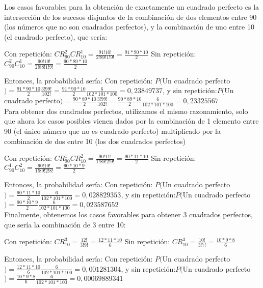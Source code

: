 \documentclass[a4paper,12pt]{article}
\begin{document}
\begin{enumerate}
\begin{enumerate}[label=\alph*)]
    Los casos favorables para la obtención de exactamente un cuadrado perfecto es la intersección de los sucesos disjuntos de la combinación de dos elementos entre 90 (los números que no son cuadrados perfectos), y la combinación de uno entre 10 (el cuadrado perfecto), que sería: 

    Con repetición: $CR_{90}^2CR_{10}^1=\frac{91!10!}{2!89!1!9!}=\frac{91*90*10}{2}$
    Sin repetición: $C_{90}^2C_{10}^1=\frac{90!10!}{2!88!1!9!}=\frac{90*89*10}{2}$

    Entonces, la probabilidad sería: Con repetición: $P($Un cuadrado perfecto$)=\frac{91*90*10}{2}\frac{3!99!}{102!}=\frac{91*90*10}{2}\frac{6}{102*101*100}=0,23849737$, y sin repetición:$P($Un cuadrado perfecto$)=\frac{90*89*10}{2}\frac{3!99!}{102!}=\frac{90*89*10}{2}\frac{6}{102*101*100}=0,23325567$\\

    Para obtener dos cuadrados perfectos, utilizamos el mismo razonamiento, solo que ahora los casos posibles vienen dados por la combinación de 1 elemento entre 90 (el único número que no es cuadrado perfecto) multiplicado por la combinación de dos entre 10 (los dos cuadrados perfectos)

    Con repetición: $CR_{90}^1CR_{10}^2=\frac{90!11!}{1!89!2!9!}=\frac{90*11*10}{2}$
    Sin repetición: $C_{90}^1C_{10}^2=\frac{90!10!}{1!89!2!8!}=\frac{90*10*9}{2}$

    Entonces, la probabilidad sería: Con repetición: $P($Un cuadrado perfecto$)=\frac{90*11*10}{2}\frac{6}{102*101*100}=0,028829353$, y sin repetición:$P($Un cuadrado perfecto$)=\frac{90*10*9}{2}\frac{6}{102*101*100}=0,023587652$\\

    Finalmente, obtenemos los casos favorables para obtener 3 cuadrados perfectos, que sería la combinación de 3 entre 10:

    Con repetición: $CR_{10}^3=\frac{12!}{3!9!}=\frac{12*11*10}{6}$
    Sin repetición: $CR_{10}^3=\frac{10!}{3!7!}=\frac{10*9*8}{6}$

    Entonces, la probabilidad sería: Con repetición: $P($Un cuadrado perfecto$)=\frac{12*11*10}{6}\frac{6}{102*101*100}=0,001281304$, y sin repetición:$P($Un cuadrado perfecto$)=\frac{10*9*8}{6}\frac{6}{102*101*100}=0,00069889341$

    
    \end{enumerate}

    
        

\end{enumerate}
\end{document}
